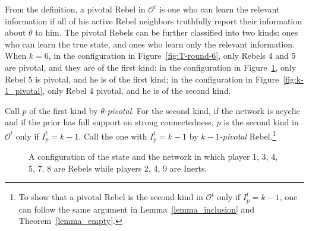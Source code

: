 \documentclass[12pt,letter]{article}
\newcommand{\Omicron}{\mathcal{O}}
\theoremstyle{definition}
\theoremstyle{remark}
\theoremstyle{claim}
\begin{document}
From the definition, a pivotal Rebel in $\Omicron^t$ is one who can learn the relevant information if all of his active Rebel neighbors truthfully report their information about $\theta$ to him. The pivotal Rebels can be further classified into two kinds: ones who can learn the true state, and ones who learn only the relevant information. When $k=6$, in the configuration in Figure~\ref{fig:T-round-6}, only Rebels 4 and 5 are pivotal, and they are of the first kind; in the configuration in Figure~\ref{fig:central_pivotal}, only Rebel 5 is pivotal, and he is of the first kind; in the configuration in Figure~\ref{fig:k-1_pivotal}, only Rebel 4 pivotal, and he is of the second kind.

Call $p$ of the first kind by \textit{$\theta$-pivotal}. For the second kind, if the network is acyclic and if the prior has full support on strong connectedness, $p$ is the second kind in $\Omicron^{t}$ only if $I^{t}_p=k-1$. Call the one with $I^t_p=k-1$ by \textit{$k-1$-pivotal} Rebel.\footnote{To show that a pivotal Rebel is the second kind in $\Omicron^{t}$ only if $I^{t}_p=k-1$, one can follow the same argument in Lemma~\ref{lemma_inclusion} and Theorem~\ref{lemma_empty}.}

\begin{figure}


\begin{center}
\end{center}
\caption{A configuration of the state and the network in which player 1, 3, 4, 5, 7, 8 are Rebels while players 2, 4, 9 are Inerts.}
\label{fig:central_pivotal}
\end{figure}
\end{document}
